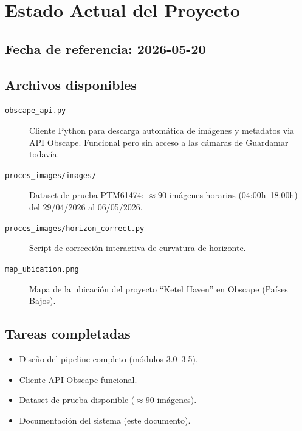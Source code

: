 \chapter{Estado Actual del Proyecto}

\section{Fecha de referencia: 2026-05-20}

\section{Archivos disponibles}

\begin{description}
  \item[\texttt{obscape\_api.py}] Cliente Python para descarga automática
        de imágenes y metadatos via API Obscape. Funcional pero sin acceso
        a las cámaras de Guardamar todavía.

  \item[\texttt{proces\_images/images/}] Dataset de prueba PTM61474:
        $\approx 90$ imágenes horarias (04:00h--18:00h) del 29/04/2026
        al 06/05/2026.

  \item[\texttt{proces\_images/horizon\_correct.py}] Script de corrección
        interactiva de curvatura de horizonte.

  \item[\texttt{map\_ubication.png}] Mapa de la ubicación del proyecto
        ``Ketel Haven'' en Obscape (Países Bajos).
\end{description}

\section{Tareas completadas}

\begin{itemize}
  \item[$\checkmark$] Diseño del pipeline completo (módulos 3.0--3.5).
  \item[$\checkmark$] Cliente API Obscape funcional.
  \item[$\checkmark$] Dataset de prueba disponible ($\approx 90$ imágenes).
  \item[$\checkmark$] Documentación del sistema (este documento).
\end{itemize}

